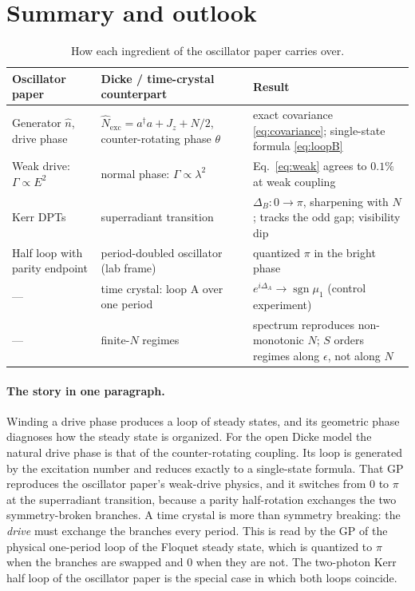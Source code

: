 \documentclass[11pt,a4paper]{article}
\newcommand{\Nex}{\hat N_{\mathrm{exc}}}
\newcommand{\ad}{a^\dagger}
\begin{document}
\section{Summary and outlook}\label{sec:summary}

\begin{table}[h]
\centering
\small
\begin{tabular}{@{}p{4.3cm}p{5.0cm}p{5.6cm}@{}}
\toprule
Oscillator paper & Dicke / time-crystal counterpart & Result\\
\midrule
Generator $\hat n$, drive phase & $\Nex=\ad a+J_z+N/2$, counter-rotating phase $\theta$ & exact covariance \eqref{eq:covariance}; single-state formula \eqref{eq:loopB}\\
Weak drive: $\Gamma\propto E^2$ & normal phase: $\Gamma\propto\lambda^2$ & Eq.~\eqref{eq:weak} agrees to $0.1\%$ at weak coupling\\
Kerr DPTs & superradiant transition & $\Delta_B:0\to\pi$, sharpening with $N$; tracks the odd gap; visibility dip\\
Half loop with parity endpoint & period-doubled oscillator (lab frame) & quantized $\pi$ in the bright phase\\
--- & time crystal: loop A over one period & $e^{i\Delta_A}\to\operatorname{sgn}\mu_1$ (control experiment)\\
--- & finite-$N$ regimes & spectrum reproduces non-monotonic $N$; $S$ orders regimes along $\epsilon$, not along $N$\\
\bottomrule
\end{tabular}
\caption{How each ingredient of the oscillator paper carries over.}
\label{tab:summary}
\end{table}

\paragraph{The story in one paragraph.} Winding a drive phase produces a loop of steady states,
and its geometric phase diagnoses how the steady state is organized. For the open Dicke model the
natural drive phase is that of the counter-rotating coupling. Its loop is generated by the
excitation number and reduces exactly to a single-state formula. That GP reproduces the oscillator
paper's weak-drive physics, and it switches from $0$ to $\pi$ at the superradiant transition,
because a parity half-rotation exchanges the two symmetry-broken branches. A time crystal is more
than symmetry breaking: the \emph{drive} must exchange the branches every period. This is read by
the GP of the physical one-period loop of the Floquet steady state, which is quantized to $\pi$
when the branches are swapped and $0$ when they are not. The two-photon Kerr half loop of the
oscillator paper is the special case in which both loops coincide.
\end{document}
